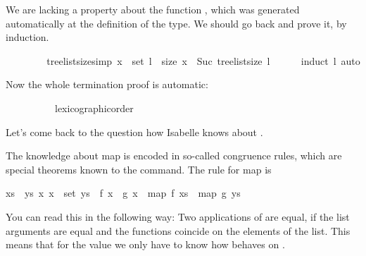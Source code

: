 \begin{isabellebody}
\begin{isamarkuptxt}
      We are lacking a property about the function , which was generated automatically at the
      definition of the  type. We should go back and prove
      it, by induction.%
\end{isamarkuptxt}%
\isamarkuptrue%
\ \ \ \ %
\endisatagproof
{\isafoldproof}%
%
\isadelimproof
%
\endisadelimproof
\isanewline
\ \ \isamarkupfalse%
\ tree{\isacharunderscore}list{\isacharunderscore}size{\isacharbrackleft}simp{\isacharbrackright}{\isacharcolon}\ {\isachardoublequoteopen}x\ {\isasymin}\ set\ l\ {\isasymLongrightarrow}\ size\ x\ {\isacharless}\ Suc\ {\isacharparenleft}tree{\isacharunderscore}list{\isacharunderscore}size\ l{\isacharparenright}{\isachardoublequoteclose}\isanewline
%
\isadelimproof
\ \ \ \ %
\endisadelimproof
%
\isatagproof
{}\isamarkupfalse%
\ {\isacharparenleft}induct\ l{\isacharparenright}\ auto%
\endisatagproof
{\isafoldproof}%
%
\isadelimproof
%
\endisadelimproof
%
\begin{isamarkuptext}%
Now the whole termination proof is automatic:%
\end{isamarkuptext}%
\isamarkuptrue%
\ \ \isamarkupfalse%
\ \isanewline
%
\isadelimproof
\ \ \ \ %
\endisadelimproof
%
\isatagproof
{}\isamarkupfalse%
\ lexicographic{\isacharunderscore}order%
\endisatagproof
{\isafoldproof}%
%
\isadelimproof
%
\endisadelimproof
%
\isamarkuptrue%
%
\begin{isamarkuptext}%
Let's come back to the question how Isabelle knows about .

  The knowledge about map is encoded in so-called congruence rules,
  which are special theorems known to the  command. The
  rule for map is

  \begin{isabelle}%
{\isasymlbrakk}{\isacharquery}xs\ {\isacharequal}\ {\isacharquery}ys{\isacharsemicolon}\ {\isasymAnd}x{\isachardot}\ x\ {\isasymin}\ set\ {\isacharquery}ys\ {\isasymLongrightarrow}\ {\isacharquery}f\ x\ {\isacharequal}\ {\isacharquery}g\ x{\isasymrbrakk}\ {\isasymLongrightarrow}\ map\ {\isacharquery}f\ {\isacharquery}xs\ {\isacharequal}\ map\ {\isacharquery}g\ {\isacharquery}ys%
\end{isabelle}

  You can read this in the following way: Two applications of  are equal, if the list arguments are equal and the functions
  coincide on the elements of the list. This means that for the value 
   we only have to know how  behaves on
  .


\end{isamarkuptext}
\end{isabellebody}
